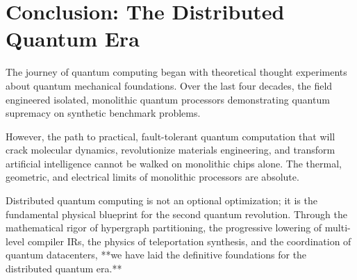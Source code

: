 \section{Conclusion: The Distributed Quantum Era}
\label{sec:conclusion}

The journey of quantum computing began with theoretical thought experiments about quantum mechanical foundations. Over the last four decades, the field engineered isolated, monolithic quantum processors demonstrating quantum supremacy on synthetic benchmark problems.

However, the path to practical, fault-tolerant quantum computation that will crack molecular dynamics, revolutionize materials engineering, and transform artificial intelligence cannot be walked on monolithic chips alone. The thermal, geometric, and electrical limits of monolithic processors are absolute. 

Distributed quantum computing is not an optional optimization; it is the fundamental physical blueprint for the second quantum revolution. Through the mathematical rigor of hypergraph partitioning, the progressive lowering of multi-level compiler IRs, the physics of teleportation synthesis, and the coordination of quantum datacenters, **we have laid the definitive foundations for the distributed quantum era.**
